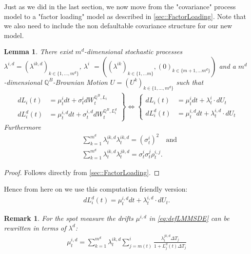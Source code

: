 \documentclass[12pt]{article}
\newtheorem{lemma}[theorem]{Lemma}
\newtheorem{remark}[theorem]{Remark}
\begin{document}
	Just as we did in the last section, we now move from the "covariance" process model to a "factor loading" model as described in \cref{sec::FactorLoading}. Note that we also need to include the non defaultable covariance structure for our new model.\\
	\begin{lemma}\label{lem:defLMMFactorVersion}
		There exist $m^d$-dimensional stochastic processes $\lambda^{i,d} = (\lambda^{i k, d})_{k \in \{1, ..., m^d\}}$, $\lambda^{i}$ $= ((\lambda^{i k})_{k \in \{1, ... m\}}, (0)_{k \in \{m+1, ... m^d\}})$ and a $m^d $-dimensional $\mathbb{Q}^B$-Brownian Motion $U=(U^k)_{k \in \{1,...,m^d\}}$ such that
		\begin{align*}
			\left.
			\begin{aligned}
				dL_i(t) &= \mu^{i}_t dt + \sigma^{i}_t dW^{\mathbb{Q}^B, L_i}_t\\
				dL^d_i(t) &= \mu^{i, d}_t dt + \sigma^{i, d}_t dW^{\mathbb{Q}^B, L^d_i}_t
			\end{aligned}
			\right\}
			 \iff 
			 \left\{
			 \begin{aligned}
			 	dL_i(t) &= \mu^{i}_t dt + \lambda^{i}_t\cdot dU_t\\
			 	dL^d_i(t) &= \mu^{i, d}_t dt + \lambda^{i,d}_t\cdot dU_t
			 \end{aligned}
			 \right.
		\end{align*}
		Furthermore
		\begin{align*}
			&\sum_{k=1}^{m^d}\lambda^{i k, d}_t \lambda^{i k, d}_t = (\sigma^i_t)^2 \quad\text{and}\\
			&\sum_{k=1}^{m^d}\lambda^{i k, d}_t \lambda^{j k, d}_t = \sigma^i_t \sigma^j_t \rho^{i,j}_t.
		\end{align*}
	\end{lemma}
	\begin{proof}
		Follows directly from \cref{sec::FactorLoading}. %
	\end{proof}
	Hence from here on we use this computation friendly version:
	\begin{align}\label{eq:defLMMSDE}
			dL^d_i(t) = \mu^{i, d}_t dt + \lambda^{i,d}_t\cdot dU_t.
	\end{align}
	\begin{remark}\label{rem:defLMMDrift}
		For the spot measure the drifts $\mu^{i,d}$ in \cref{eq:defLMMSDE} can be rewritten in terms of $\lambda^{d}$:
		\begin{align*}
			\mu^{i,d}_t = \sum_{k=1}^{m^d}\lambda^{i k, d}_t \sum_{j=m(t)}^{i}\frac{\lambda^{j k, d}_t\Delta T_j}{1 + L^d_j(t)\Delta T_j}
		\end{align*}
	\end{remark}
\end{document}
